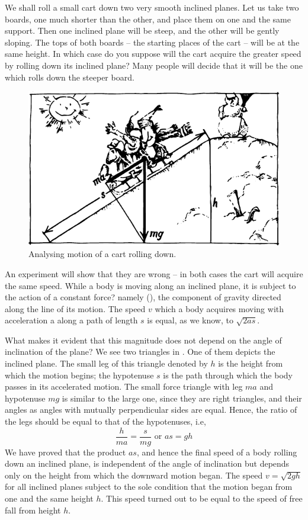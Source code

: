 We shall roll a small cart down two very smooth
inclined planes. Let us take two boards, one much shorter
than the other, and place them on one and the same support. Then one inclined plane will be steep, and the
other will be gently sloping. The tops of both boards -- the starting places of the cart -- will be at the same height.
In which case do you suppose will the cart acquire the
greater speed by rolling down its inclined plane? Many
people will decide that it will be the one which rolls
down the steeper board.
\begin{figure}[!ht]
\centering
\includegraphics[width=\textwidth]{figures/fig-03-04.pdf}
\caption{Analysing motion of a cart rolling down.}
\label{fig-3.04}
\end{figure}

An experiment will show that they are wrong -- in both
cases the cart will acquire the same speed. While a body
is moving along an inclined plane, it is subject to the
action of a constant force? namely (), the component of gravity directed along the line of its motion. The speed $v$ which a body acquires moving with acceleration a along a path of length $s$ is equal, as we know, to $\sqrt{2as}$.

What makes it evident that this magnitude does not
depend on the angle of inclination of the plane? We see
two triangles in . One of them depicts the
inclined plane. The small leg of this triangle denoted by
$h$ is the height from which the motion begins; the hypotenuse $s$ is the path through which the body passes in its
accelerated motion. The small force triangle with leg
$ma$ and hypotenuse $mg$ is similar to the large one, since
they are right triangles, and their angles as angles with
mutually perpendicular sides are equal. Hence, the ratio
of the legs should be equal to that of the hypotenuses, i.e,
\begin{equation*}%
\frac{h}{ma} = \frac{s}{mg} \,\, \textrm{or} \,\,  as = gh
\end{equation*}
We have proved that the product $as$, and hence the
final speed of a body rolling down an inclined plane, is
independent of the angle of inclination but depends only
on the height from which the downward motion began.
The speed $v = \sqrt{2gh}$ for all inclined planes subject to the
sole condition that the motion began from one and the
same height $h$. This speed turned out to be equal to the
speed of free fall from height $h$.

